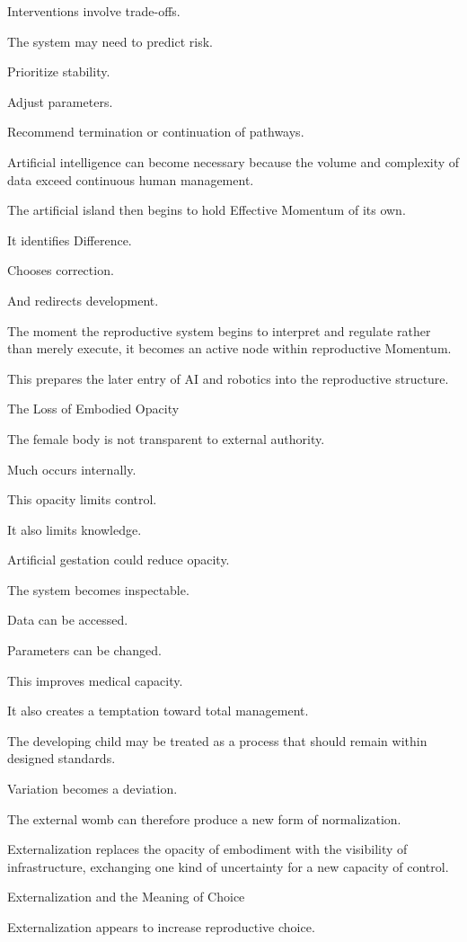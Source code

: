 Interventions involve trade-offs.

The system may need to predict risk.

Prioritize stability.

Adjust parameters.

Recommend termination or continuation of pathways.

Artificial intelligence can become necessary because the volume and complexity of data exceed continuous human management.

The artificial island then begins to hold Effective Momentum of its own.

It identifies Difference.

Chooses correction.

And redirects development.

The moment the reproductive system begins to interpret and regulate rather than merely execute, it becomes an active node within reproductive Momentum.

This prepares the later entry of AI and robotics into the reproductive structure.

The Loss of Embodied Opacity

The female body is not transparent to external authority.

Much occurs internally.

This opacity limits control.

It also limits knowledge.

Artificial gestation could reduce opacity.

The system becomes inspectable.

Data can be accessed.

Parameters can be changed.

This improves medical capacity.

It also creates a temptation toward total management.

The developing child may be treated as a process that should remain within designed standards.

Variation becomes a deviation.

The external womb can therefore produce a new form of normalization.

Externalization replaces the opacity of embodiment with the visibility of infrastructure, exchanging one kind of uncertainty for a new capacity of control.

Externalization and the Meaning of Choice

Externalization appears to increase reproductive choice.


